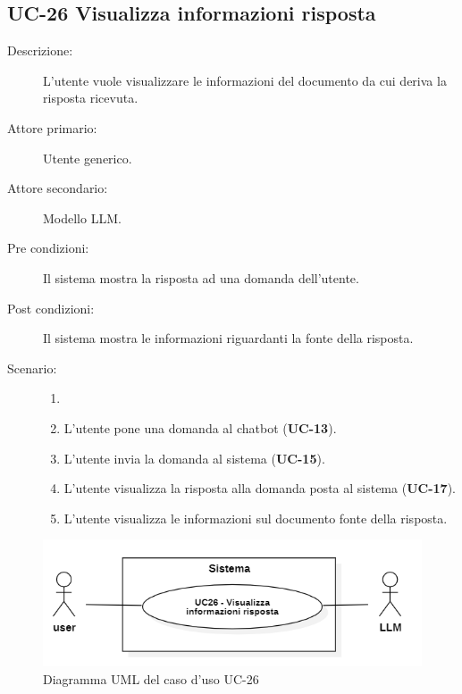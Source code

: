 \subsection{UC-26 Visualizza informazioni risposta}
\begin{description}
    \item[Descrizione:] L'utente vuole visualizzare le informazioni del documento da cui deriva la risposta ricevuta.
    \item[Attore primario:] Utente generico.
    \item[Attore secondario:] Modello LLM.
    \item[Pre condizioni:] Il sistema mostra la risposta ad una domanda dell'utente.
    \item[Post condizioni:] Il sistema mostra le informazioni riguardanti la fonte della risposta.
    \item[Scenario:]
    \begin{enumerate}
        \item[]
        \item L’utente pone una domanda al chatbot (\textbf{UC-13}).
        \item L'utente invia la domanda al sistema (\textbf{UC-15}).
        \item L'utente visualizza la risposta alla domanda posta al sistema (\textbf{UC-17}).
        \item L'utente visualizza le informazioni sul documento fonte della risposta.
    \end{enumerate}
\end{description}

\begin{figure}[H]
    \centering
    \includegraphics[width=0.9\linewidth]{UC26.png}  %
    \caption{Diagramma UML del caso d'uso UC-26}
    \label{fig:UC32}
\end{figure}

